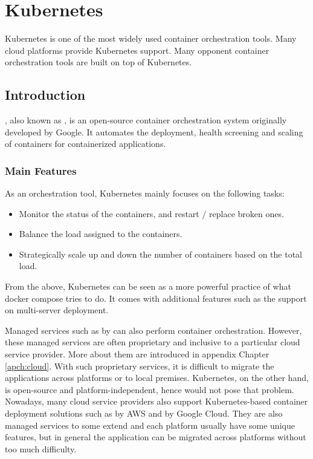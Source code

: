 \chapter{Kubernetes}

Kubernetes is one of the most widely used container orchestration tools. Many cloud platforms provide Kubernetes support. Many opponent container orchestration tools are built on top of Kubernetes.

\section{Introduction}

, also known as , is an open-source container orchestration system originally developed by Google. It automates the deployment, health screening and scaling of containers for containerized applications.

\subsection{Main Features}

As an orchestration tool, Kubernetes mainly focuses on the following tasks:
\begin{itemize}
	\item Monitor the status of the containers, and restart / replace broken ones.
	\item Balance the load assigned to the containers.
	\item Strategically scale up and down the number of containers based on the total load.
\end{itemize}
From the above, Kubernetes can be seen as a more powerful practice of what docker compose tries to do. It comes with additional features such as the support on multi-server deployment.

Managed services such as  by  can also perform container orchestration. However, these managed services are often proprietary and inclusive to a particular cloud service provider. More about them are introduced in appendix Chapter \ref{apch:cloud}. With such proprietary services, it is difficult to migrate the applications across platforms or to local premises. Kubernetes, on the other hand, is open-source and platform-independent, hence would not pose that problem. Nowadays, many cloud service providers also support Kubernetes-based container deployment solutions such as  by AWS and  by Google Cloud. They are also managed services to some extend and each platform usually have some unique features, but in general the application can be migrated across platforms without too much difficulty.

